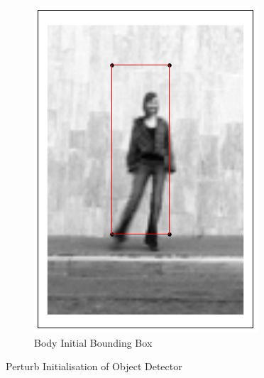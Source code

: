\begin{figure}[h]
\begin{subfigure}[b]{0.1\textwidth}
            \includegraphics[width=\textwidth]{supports/Segmentation_Measure/body}
        \caption{Body Initial Bounding Box}
    \end{subfigure}
    \caption{Perturb Initialisation of Object Detector}
    \label{fig:seg_init}
\end{figure}

